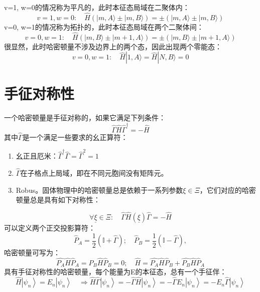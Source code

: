 \documentclass[12pt, a4paper, oneside]{ctexbook}
\begin{document}
v=1, w=0的情况称为平凡的，此时本征态局域在二聚体内：
\begin{equation}
	v=1, w=0: \quad \hat{H}(|m, A\rangle \pm|m, B\rangle)= \pm(|m, A\rangle \pm|m, B\rangle)
\end{equation}
v=0, w=1的情况称为拓扑的，此时本征态局域在两个二聚体间：
\begin{equation}
	v=0, w=1: \quad \hat{H}(|m, B\rangle \pm|m+1, A\rangle)= \pm(|m, B\rangle \pm|m+1, A\rangle)
\end{equation}
很显然，此时哈密顿量不涉及边界上的两个态，因此出现两个零能态：
\begin{equation}
	v=0, w=1: \quad \hat{H}|1, A\rangle=\hat{H}|N, B\rangle=0
\end{equation}
\section{手征对称性}
一个哈密顿量是手征对称的，如果它满足下列条件：
\begin{equation}
	\hat{\Gamma} \hat{H} \hat{\Gamma}^{\dagger}=-\hat{H}
\end{equation}
其中$ \hat{\Gamma}  $是一个满足一些要求的幺正算符：
\begin{enumerate}
	\item 幺正且厄米：$ \hat{\Gamma}^{\dagger} \hat{\Gamma}=\hat{\Gamma}^2=1 $ 
	\item $ \hat{\Gamma} $在子格点上局域，即在不同元胞间没有矩阵元。
	\item Robus。固体物理中的哈密顿量总是依赖于一系列参数$ \xi \in \Xi $，它们对应的哈密顿量总是具有如下对称性：
\end{enumerate} 
\begin{equation}
	\forall \underline{\xi} \in \Xi: \quad \hat{\Gamma} \hat{H}(\underline{\xi}) \hat{\Gamma}=-\hat{H}
\end{equation}
可以定义两个正交投影算符：
\begin{equation}
	\hat{P}_A=\frac{1}{2}(\mathbb{I}+\hat{\Gamma}) ; \quad \hat{P}_B=\frac{1}{2}(\mathbb{I}-\hat{\Gamma}),
\end{equation}
哈密顿量可写为：
\begin{equation}
	\hat{P_A} \hat{H} \hat{P}_A=P_B \hat{H} \hat{P}_B=0 ; \quad \hat{H}=\hat{P_A} \hat{H} \hat{P}_B+\hat{P_B} \hat{H} \hat{P}_A
\end{equation}
具有手征对称性的哈密顿量，每个能量为E的本征态，总有一个手征伴：
\begin{equation}
	\hat{H}\left|\psi_n\right\rangle=E_n\left|\psi_n\right\rangle \quad \Longrightarrow \hat{H} \hat{\Gamma}\left|\psi_n\right\rangle=-\hat{\Gamma} \hat{H}\left|\psi_n\right\rangle=-\hat{\Gamma} E_n\left|\psi_n\right\rangle=-E_n \hat{\Gamma}\left|\psi_n\right\rangle
\end{equation}
\end{document}
